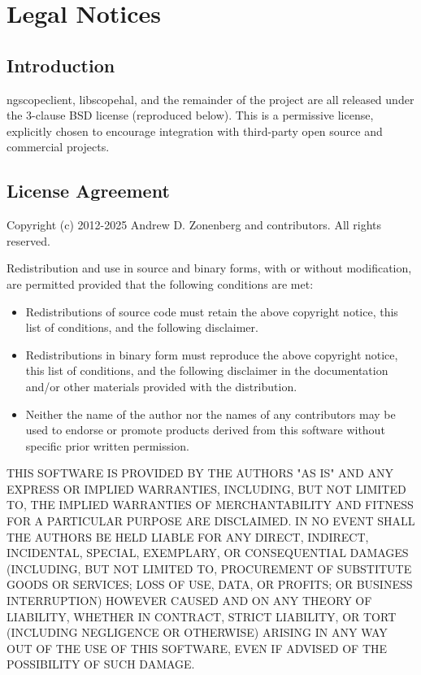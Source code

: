 \chapter{Legal Notices}

\section{Introduction}

ngscopeclient, libscopehal, and the remainder of the project are all released under the 3-clause BSD license
(reproduced below). This is a permissive license, explicitly chosen to encourage integration with third-party open
source and commercial projects.

\section{License Agreement}

Copyright (c) 2012-2025 Andrew D. Zonenberg and contributors.
All rights reserved.

Redistribution and use in source and binary forms, with or without modification, are permitted provided that the
following conditions are met:
\begin{itemize}
\item Redistributions of source code must retain the above copyright notice, this list of conditions, and the
following disclaimer.
\item Redistributions in binary form must reproduce the above copyright notice, this list of conditions, and the
following disclaimer in the documentation and/or other materials provided with the distribution.
\item Neither the name of the author nor the names of any contributors may be used to endorse or promote products
derived from this software without specific prior written permission.
\end{itemize}

THIS SOFTWARE IS PROVIDED BY THE AUTHORS "AS IS" AND ANY EXPRESS OR IMPLIED WARRANTIES, INCLUDING, BUT NOT LIMITED
TO, THE IMPLIED WARRANTIES OF MERCHANTABILITY AND FITNESS FOR A PARTICULAR PURPOSE ARE DISCLAIMED. IN NO EVENT SHALL
THE AUTHORS BE HELD LIABLE FOR ANY DIRECT, INDIRECT, INCIDENTAL, SPECIAL, EXEMPLARY, OR CONSEQUENTIAL DAMAGES
(INCLUDING, BUT NOT LIMITED TO, PROCUREMENT OF SUBSTITUTE GOODS OR SERVICES; LOSS OF USE, DATA, OR PROFITS; OR
BUSINESS INTERRUPTION) HOWEVER CAUSED AND ON ANY THEORY OF LIABILITY, WHETHER IN CONTRACT, STRICT LIABILITY, OR TORT
(INCLUDING NEGLIGENCE OR OTHERWISE) ARISING IN ANY WAY OUT OF THE USE OF THIS SOFTWARE, EVEN IF ADVISED OF THE
POSSIBILITY OF SUCH DAMAGE.


